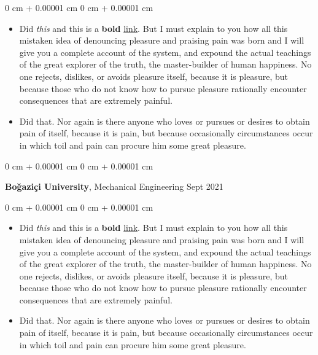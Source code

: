 \documentclass[10pt, letterpaper]{article}
\newenvironment{highlights}{
    \begin{itemize}[
        topsep=0.10 cm,
        parsep=0.10 cm,
        partopsep=0pt,
        itemsep=0pt,
        leftmargin=0 cm + 10pt
    ]
}{
    \end{itemize}
} %
\newenvironment{onecolentry}{
    \begin{adjustwidth}{
        0 cm + 0.00001 cm
    }{
        0 cm + 0.00001 cm
    }
}{
    \end{adjustwidth}
} %
\newenvironment{twocolentry}[2][]{
    \onecolentry
    \def\secondColumn{#2}
    \setcolumnwidth{\fill, 4.5 cm}
    \begin{paracol}{2}
}{
    \switchcolumn \raggedleft \secondColumn
    \end{paracol}
    \endonecolentry
} %
\begin{document}
        \vspace{0.10 cm}
        \begin{onecolentry}
            \begin{highlights}
                \item Did \textit{this} and this is a \textbf{bold} \href{https://example.com}{link}. But I must explain to you how all this mistaken idea of denouncing pleasure and praising pain was born and I will give you a complete account of the system, and expound the actual teachings of the great explorer of the truth, the master-builder of human happiness. No one rejects, dislikes, or avoids pleasure itself, because it is pleasure, but because those who do not know how to pursue pleasure rationally encounter consequences that are extremely painful.
                \item Did that. Nor again is there anyone who loves or pursues or desires to obtain pain of itself, because it is pain, but because occasionally circumstances occur in which toil and pain can procure him some great pleasure.
            \end{highlights}
        \end{onecolentry}


        \vspace{0.2 cm}

        \begin{twocolentry}{
            Sept 2021
        }
            \textbf{Boğaziçi University}, Mechanical Engineering\end{twocolentry}

        \vspace{0.10 cm}
        \begin{onecolentry}
            \begin{highlights}
                \item Did \textit{this} and this is a \textbf{bold} \href{https://example.com}{link}. But I must explain to you how all this mistaken idea of denouncing pleasure and praising pain was born and I will give you a complete account of the system, and expound the actual teachings of the great explorer of the truth, the master-builder of human happiness. No one rejects, dislikes, or avoids pleasure itself, because it is pleasure, but because those who do not know how to pursue pleasure rationally encounter consequences that are extremely painful.
                \item Did that. Nor again is there anyone who loves or pursues or desires to obtain pain of itself, because it is pain, but because occasionally circumstances occur in which toil and pain can procure him some great pleasure.
            \end{highlights}
        \end{onecolentry}
\end{document}

